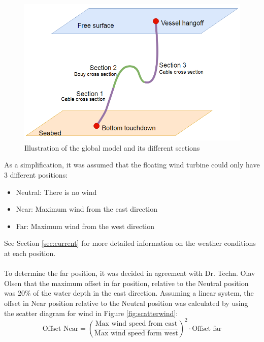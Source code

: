 \begin{figure}[H]
\centering
\includegraphics[scale=0.6]{figures/globalill}
\caption [$\; \:$ Illustration of the global model and its different sections ]{Illustration of the global model and its different sections}
 \label{fig:globalill}
\end{figure}
\noindent As a simplification, it was assumed that the floating wind turbine could only have 3 different positions:
\begin{itemize}
    \item Neutral: There is no wind
    \item Near: Maximum wind from the east direction
    \item Far: Maximum wind from the west direction
\end{itemize}
See Section \ref{sec:current} for more detailed information on the weather conditions at each position. \\\\
To determine the far position, it was decided in agreement with Dr. Techn. Olav Olsen that the maximum offset in far position, relative to the Neutral position was 20\% of the water depth in the east direction. Assuming a linear system, the offset in Near position relative to the Neutral position was calculated by using the scatter diagram for wind in Figure \ref{fig:scatterwind}:
\begin{equation}
    \text{Offset Near}=\left(\frac{\text{Max  wind speed from east}}{\text{Max wind speed form west}}\right)^2 \cdot \text{Offset far}
\end{equation}

